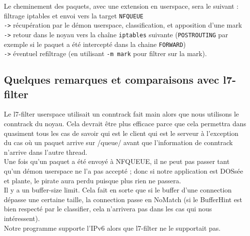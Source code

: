 Le cheminement des paquets, avec une extension en userspace, sera le suivant :\\
filtrage iptables et envoi vers la target \verb+NFQUEUE+\\
\verb+->+ récupération par le démon userspace, classification, et apposition d'une mark\\
\verb+->+ retour dans le noyau vers la chaîne \verb+iptables+ suivante (\verb+POSTROUTING+ par exemple si le paquet a été intercepté dans la chaine \verb+FORWARD+)\\
\verb+->+ éventuel refiltrage (en utilisant \verb+-m mark+ pour filtrer sur la mark).



\subsection*{Quelques remarques et comparaisons avec l7-filter}
Le l7-filter userspace utilisait un conntrack fait main alors que nous utilisons le conntrack du noyau. Cela devrait être plus efficace parce que cela permettra dans quasiment tous les cas de savoir qui est le client qui est le serveur à l'exception du cas où un paquet arrive sur /queue/ avant que l'information de conntrack n'arrive dans l'autre thread.\\

Une fois qu'un paquet a été envoyé à NFQUEUE, il ne peut pas passer
tant qu'un démon userspace ne l'a pas accepté ; donc si notre application est
DOSsée et plante, le pirate aura perdu puisque plus rien ne passera.\\

Il y a un buffer-size limit. Cela fait en sorte que si le
buffer d'une connection dépasse une certaine taille, la connection
passe en NoMatch (si le BufferHint est bien respecté par le
classifier, cela n'arrivera pas dans les cas qui nous intéressent).\\

Notre programme supporte l'IPv6 alors que l7-filter ne le supportait pas.\\
